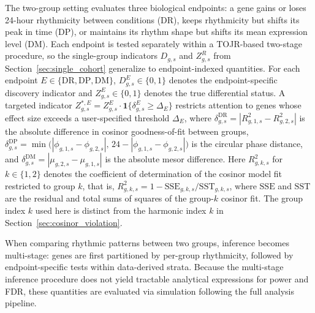 \documentclass{article}
\begin{document}
The two-group setting evaluates three biological endpoints: a gene
gains or loses 24-hour rhythmicity between conditions (DR), keeps
rhythmicity but shifts its peak in time (DP), or maintains its
rhythm shape but shifts its mean expression level (DM). Each
endpoint is tested separately within a TOJR-based two-stage
procedure, so the single-group indicators $D_{g,s}$ and $Z_{g,s}^R$
from Section~\ref{sec:single_cohort} generalize to endpoint-indexed
quantities. For each endpoint
$E\in\{\mathrm{DR},\mathrm{DP},\mathrm{DM}\}$,
$D_{g,s}^E\in\{0,1\}$ denotes the endpoint-specific discovery indicator and
$Z_{g,s}^E\in\{0,1\}$ denotes the true differential status. A targeted indicator $Z_{g,s}^{*,E} = Z_{g,s}^E \cdot \mathbf{1}\{\delta_{g,s}^E \geq \Delta_E\}$ restricts attention to genes whose effect size exceeds a user-specified threshold $\Delta_E$, where
$\delta_{g,s}^{\mathrm{DR}} = |R_{g,1,s}^2 - R_{g,2,s}^2|$ is the absolute difference in cosinor goodness-of-fit between groups,
$\delta_{g,s}^{\mathrm{DP}} = \min\!\bigl(|\phi_{g,1,s}-\phi_{g,2,s}|,\,24-|\phi_{g,1,s}-\phi_{g,2,s}|\bigr)$ is the circular phase distance,
and $\delta_{g,s}^{\mathrm{DM}} = |\mu_{g,2,s} - \mu_{g,1,s}|$ is the absolute mesor difference.
Here $R_{g,k,s}^2$ for $k \in \{1, 2\}$ denotes the coefficient of
determination of the cosinor model fit restricted to group $k$, that
is, $R_{g,k,s}^2 = 1 - \mathrm{SSE}_{g,k,s}/\mathrm{SST}_{g,k,s}$,
where $\mathrm{SSE}$ and $\mathrm{SST}$ are the residual and total sums
of squares of the group-$k$ cosinor fit. The group index $k$ used here
is distinct from the harmonic index $k$ in
Section~\ref{sec:cosinor_violation}.

When comparing rhythmic patterns between two groups, inference becomes
multi-stage: genes are first partitioned by per-group rhythmicity, followed by
endpoint-specific tests within data-derived strata. Because the multi-stage inference procedure does not yield tractable analytical
expressions for power and FDR, these quantities are evaluated via simulation
following the full analysis pipeline.
\end{document}
